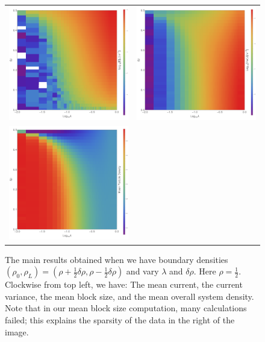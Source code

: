 \begin{figure} \caption[Results obtained by fixing the average of the boundary densities and varying their difference and $\lambda$]{The main results obtained 
when we have boundary densities 
$(\rho_0, \rho_L)=(\rho + \frac{1}{2} \delta \rho , \rho - \frac{1}{2} \delta \rho)$ and vary $\lambda$ and $\delta \rho$.
Here $\rho=\frac{1}{2}$. Clockwise from top left, we have: The mean current, the current variance,
the mean block size, and the mean overall system density. Note that in our mean block size
computation, many calculations failed; this explains the sparsity of the data in the right
of the image.} 
\label{fig:constDens}
\begin{center}
\begin{tabular}{c c} 
\includegraphics[width=0.49\linewidth]{numerics/images/lambdaConcDiff/current} & \includegraphics[width=0.49\linewidth]{numerics/images/lambdaConcDiff/currentVar} \\
\includegraphics[width=0.49\linewidth]{numerics/images/lambdaConcDiff/density} &

\end{tabular}
\end{center}
\end{figure}
